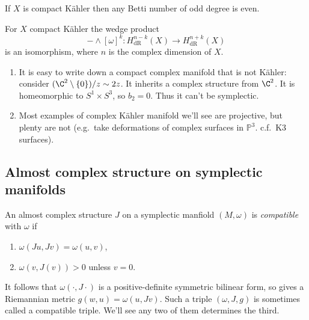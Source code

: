 \documentclass[a4paper]{article}
\renewcommand*{\P}{\mathbb{P}}
\newcommand{\w}{\wedge} %
\begin{document}
\begin{corollary}
  If \(X\) is compact Kähler then any Betti number of odd degree is even.
\end{corollary}

\begin{theorem}[Lefschetz]
  For \(X\) compact Kähler the wedge product
  \[
    - \w [\omega]^k: H^{n - k}_{\mathrm{dR}}(X) \to H^{n + k}_{\mathrm{dR}}(X)
  \]
  is an isomorphism, where \(n\) is the complex dimension of \(X\).
\end{theorem}

\begin{remark}\leavevmode
  \begin{enumerate}
  \item It is easy to write down a compact complex manifold that is not Kähler: consider \((\C^2 \setminus \{0\})/z \sim 2z\). It inherits a complex structure from \(\C^2\). It is homeomorphic to \(S^1 \times S^3\), so \(b_2 = 0\). Thus it can't be symplectic.
  \item Most examples of complex Kähler manifold we'll see are projective, but plenty are not (e.g.\ take deformations of complex surfaces in \(\P^3\). c.f.\ K3 surfaces).
  \end{enumerate}
\end{remark}

\subsection{Almost complex structure on symplectic manifolds}

\begin{definition}
  An almost complex structure \(J\) on a symplectic manfiold \((M, \omega)\) is \emph{compatible} with \(\omega\) if
  \begin{enumerate}
  \item \(\omega(Ju, Jv) = \omega(u, v)\),
  \item \(\omega(v, J(v)) > 0\) unless \(v = 0\).
  \end{enumerate}
\end{definition}

\begin{note}
  It follows that \(\omega(\cdot, J \cdot)\) is a positive-definite symmetric bilinear form, so gives a Riemannian metric \(g(w, u) = \omega(u, Jv)\). Such a triple \((\omega, J, g)\) is sometimes called a compatible triple. We'll see any two of them determines the third.
\end{note}
\end{document}
